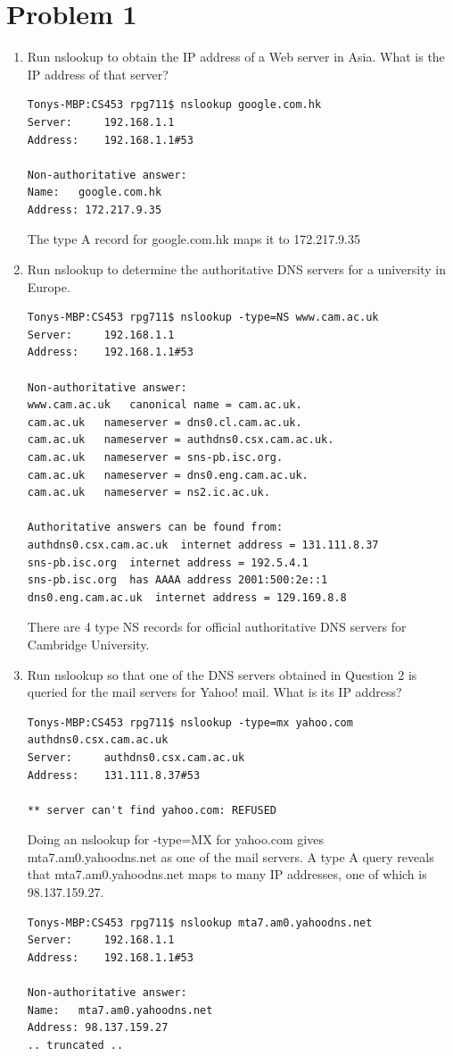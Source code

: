 \documentclass[letter,10pt]{article}
\begin{document}
\section{Problem 1}
\begin{enumerate}

\item Run nslookup to obtain the IP address of a Web server in Asia. What is the IP address of that server? \\
\begin{verbatim}
Tonys-MBP:CS453 rpg711$ nslookup google.com.hk
Server:		192.168.1.1
Address:	192.168.1.1#53

Non-authoritative answer:
Name:	google.com.hk
Address: 172.217.9.35
\end{verbatim} 
The type A record for google.com.hk maps it to 172.217.9.35

\item Run nslookup to determine the authoritative DNS servers for a university in
Europe.

\begin{verbatim}
Tonys-MBP:CS453 rpg711$ nslookup -type=NS www.cam.ac.uk
Server:		192.168.1.1
Address:	192.168.1.1#53

Non-authoritative answer:
www.cam.ac.uk	canonical name = cam.ac.uk.
cam.ac.uk	nameserver = dns0.cl.cam.ac.uk.
cam.ac.uk	nameserver = authdns0.csx.cam.ac.uk.
cam.ac.uk	nameserver = sns-pb.isc.org.
cam.ac.uk	nameserver = dns0.eng.cam.ac.uk.
cam.ac.uk	nameserver = ns2.ic.ac.uk.

Authoritative answers can be found from:
authdns0.csx.cam.ac.uk	internet address = 131.111.8.37
sns-pb.isc.org	internet address = 192.5.4.1
sns-pb.isc.org	has AAAA address 2001:500:2e::1
dns0.eng.cam.ac.uk	internet address = 129.169.8.8
\end{verbatim}

There are 4 type NS records for official authoritative DNS servers for Cambridge University.

\item Run nslookup so that one of the DNS servers obtained in Question 2 is queried for
the mail servers for Yahoo! mail. What is its IP address?

\begin{verbatim}
Tonys-MBP:CS453 rpg711$ nslookup -type=mx yahoo.com authdns0.csx.cam.ac.uk
Server:		authdns0.csx.cam.ac.uk
Address:	131.111.8.37#53

** server can't find yahoo.com: REFUSED
\end{verbatim}

Doing an nslookup for -type=MX for yahoo.com gives mta7.am0.yahoodns.net as one of the mail servers. A type A query reveals that mta7.am0.yahoodns.net maps to many IP addresses, one of which is 98.137.159.27.

\begin{verbatim}
Tonys-MBP:CS453 rpg711$ nslookup mta7.am0.yahoodns.net
Server:		192.168.1.1
Address:	192.168.1.1#53

Non-authoritative answer:
Name:	mta7.am0.yahoodns.net
Address: 98.137.159.27
.. truncated ..
\end{verbatim}

\end{enumerate}
\end{document}
